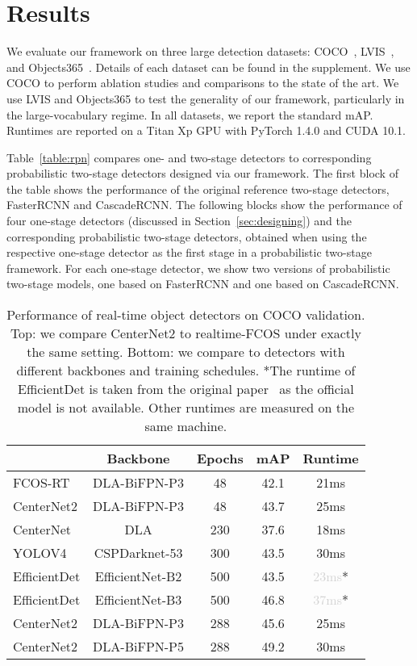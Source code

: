 \documentclass{article}
\newcommand{\name}{CenterNet2 }
\begin{document}
\section{Results}

We evaluate our framework on three large detection datasets: COCO~\cite{lin2014coco}, LVIS~\cite{gupta2019lvis}, and Objects365~\cite{gao2019objects365}.
Details of each dataset can be found in the supplement.
We use COCO to perform ablation studies and comparisons to the state of the art.
We use LVIS and Objects365 to test the generality of our framework, particularly in the large-vocabulary regime.
In all datasets, we report the standard mAP.
Runtimes are reported on a Titan Xp GPU with PyTorch 1.4.0 and CUDA 10.1.

Table~\ref{table:rpn} compares one- and two-stage detectors to corresponding probabilistic two-stage detectors designed via our framework.
The first block of the table shows the performance of the original reference two-stage detectors, FasterRCNN and CascadeRCNN.
The following blocks show the performance of four one-stage detectors (discussed in Section~\ref{sec:designing}) and the corresponding probabilistic two-stage detectors, obtained when using the respective one-stage detector as the first stage in a probabilistic two-stage framework. For each one-stage detector, we show two versions of probabilistic two-stage models, one based on FasterRCNN and one based on CascadeRCNN.


\begin{table}[t]
\centering
\begin{tabular}{@{}l@{\ \ }c@{\ \ }c@{\ \ }c@{\ \ }c@{}}
\toprule
& Backbone & Epochs & mAP & Runtime \\
\midrule
FCOS-RT & DLA-BiFPN-P3 & 48 & 42.1 & 21ms \\
\name & DLA-BiFPN-P3 & 48 & 43.7 & 25ms \\
\midrule
CenterNet & DLA & 230 & 37.6 & 18ms \\
YOLOV4 & CSPDarknet-53 & 300 & 43.5 & 30ms \\
EfficientDet & EfficientNet-B2 & 500 & 43.5 & \textcolor{lightgray}{23ms}* \\
EfficientDet & EfficientNet-B3 & 500 & 46.8 & \textcolor{lightgray}{37ms}* \\
\name & DLA-BiFPN-P3 & 288 & 45.6 & 25ms \\
\midrule
\name & DLA-BiFPN-P5 & 288 & 49.2 & 30ms \\
\bottomrule
\end{tabular}
\vspace{-2mm}
\caption{Performance of real-time object detectors on COCO validation. Top: we compare \name to realtime-FCOS under exactly the same setting. Bottom: we compare to detectors with different backbones and training schedules. *The runtime of EfficientDet is taken from the original paper~\cite{tan2020efficientdet} as the official model is not available. Other runtimes are measured on the same machine.}
\label{table:realtime}
\vspace{-5mm}
\end{table}
\end{document}
